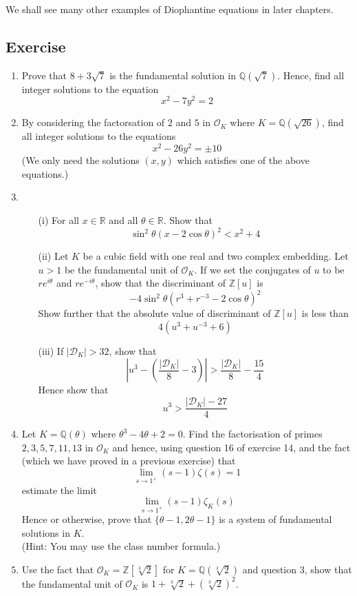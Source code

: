 We shall see many other examples of Diophantine equations in later chapters.
\subsection{Exercise}
\begin{enumerate}
\item Prove that $8+3\sqrt{7}$ is the fundamental solution in $\mathbb{Q}(\sqrt{7})$. Hence, find all
integer solutions to the equation
$$x^2-7y^2=2$$
\item By considering the factorsation of $2$ and $5$ in $\mathcal{O}_K$ where $K=\mathbb{Q}(\sqrt{26})$, find all integer solutions to the equations
$$x^2-26y^2=\pm 10$$
(We only need the solutions $(x,y)$ which satisfies one of the above equations.)
\item
\begin{enumerate}
\item[(i)] For all $x\in \mathbb{R}$ and all $\theta \in \mathbb{R}$. Show that
$$\sin^2{\theta}(x-2\cos{\theta})^2 <x^2+4$$
\item[(ii)]
Let $K$ be a cubic field with one real and two complex embedding. Let $u>1$ be the fundamental
unit of $\mathcal{O}_K$. If we set the conjugates of $u$ to be $re^{i\theta}$ and $re^{-i\theta}$,
show that the discriminant of $\mathbb{Z}[u]$ is
$$-4\sin^2{\theta}(r^3+r^{-3}-2\cos{\theta})^2$$
Show further that the absolute value of discriminant of $\mathbb{Z}[u]$ is less than
$$4(u^3+u^{-3}+6)$$
\item[(iii)]
If $|\mathcal{D}_K| >32$, show that
$$\left|u^3-\left(\frac{|\mathcal{D}_K|}{8}-3\right)\right| >\frac{|\mathcal{D}_K|}{8}-\frac{15}{4}$$
Hence show that
$$u^3 >\frac{|\mathcal{D}_K|-27}{4}$$
\end{enumerate}
\item Let $K=\mathbb{Q}(\theta)$ where $\theta^3-4\theta+2=0$. 
Find the factorisation of primes $2,3,5,7,11,13$ in $\mathcal{O}_K$ and hence, using question 16 of exercise 14, and the fact (which we have proved in a previous exercise) that 
$$\lim_{s \to 1^+}(s-1)\zeta(s)=1$$
estimate the limit
$$\lim_{s \to 1^+}(s-1)\zeta_K(s)$$
Hence or otherwise, prove that $\{\theta-1, 2\theta-1\}$ is a system of fundamental solutions in $K$.\\
(Hint: You may use the class number formula.)
\item Use the fact that $\mathcal{O}_K=\mathbb{Z}[\sqrt[3]{2}]$ for $K=\mathbb{Q}(\sqrt[3]{2})$ and question $3$, show that the fundamental unit of $\mathcal{O}_K$ is $1+\sqrt[3]{2}+(\sqrt[3]{2})^2$.

\end{enumerate}
